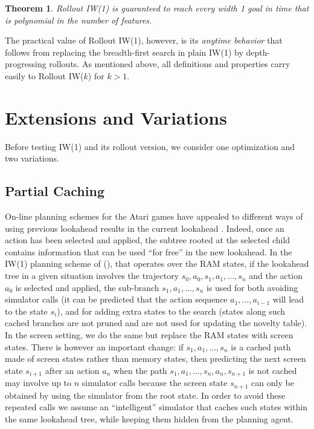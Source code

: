 \documentclass[letterpaper]{article}
\newtheorem{theorem}[definition]{Theorem}
\begin{document}
\begin{theorem}
Rollout IW(1) is guaranteed to reach every width 1 goal in time that is polynomial in the number of features.
\end{theorem}

The practical value of Rollout IW(1), however,  is its \emph{anytime behavior} that
follows from replacing the breadth-first search in plain IW(1) by depth-progressing
rollouts. As mentioned above, all definitions and properties carry easily
to Rollout IW($k$) for $k > 1$.


\section{Extensions and Variations}

Before testing IW(1) and its rollout version, we consider one optimization and two variations.


\subsection{Partial Caching}

On-line planning schemes for the Atari games have appealed to different ways of using  previous lookahead results
in the current lookahead \cite{ale}. Indeed, once an action has been selected and applied, the subtree rooted
at the selected child contains information that can be used ``for free''  in the new lookahead.
In the IW(1) planning scheme of \citeauthor{nir:ijcai2015} (\citeyear{nir:ijcai2015}), that operates over
the RAM states, if the lookahead tree in a given situation involves the trajectory $s_0,a_0,s_1,a_1,\ldots,s_n$
and the action $a_0$ is selected and applied, the sub-branch $s_1,a_1, \ldots,s_n$ is used for both
avoiding simulator calls (it can be predicted that the action sequence $a_1,\ldots, a_{i-1}$ will lead to
the state $s_i$), and for adding extra states to the search (states along such cached branches are not
pruned and are not used for updating the novelty table).  In the screen setting, we do the same but replace
the RAM states with screen states. There is however an important change: if $s_1,a_1,\ldots,s_n$ is a cached
path made of screen states rather than memory states, then predicting the next screen state $s_{i+1}$
after an action $a_n$ when the path $s_1,a_1,\ldots,s_n,a_n,s_{n+1}$ is not cached may involve
up to $n$ simulator calls because the screen state $s_{n+1}$ can only be obtained by using
the simulator from the root state.
In order to avoid these repeated  calls we assume an ``intelligent'' simulator that caches such states within
the same lookahead tree, while keeping them hidden from the planning agent.
\end{document}

